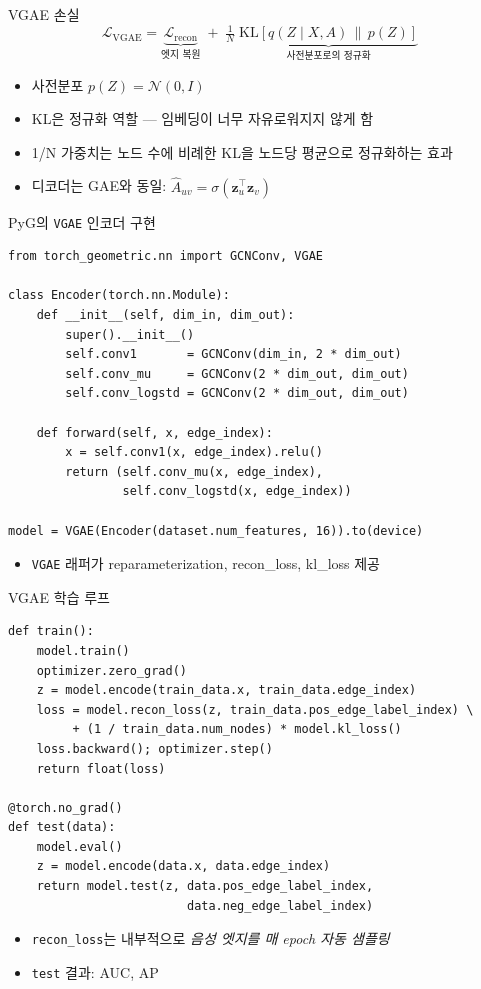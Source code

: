 \begin{frame}{VGAE 손실}
\begin{equation*}
  \mathcal{L}_{\text{VGAE}} = \underbrace{\mathcal{L}_{\text{recon}}}_{\text{엣지 복원}}
    \;+\; \tfrac{1}{N}\;\underbrace{\mathrm{KL}\!\left[q(Z\mid X,A)\,\|\,p(Z)\right]}_{\text{사전분포로의 정규화}}
\end{equation*}
\begin{itemize}
  \item 사전분포 $p(Z) = \mathcal{N}(0,I)$
  \item KL은 정규화 역할 — 임베딩이 너무 자유로워지지 않게 함
  \item 1/N 가중치는 노드 수에 비례한 KL을 노드당 평균으로 정규화하는 효과
  \item 디코더는 GAE와 동일: $\hat{A}_{uv} = \sigma(\mathbf{z}_u^\top \mathbf{z}_v)$
\end{itemize}
\end{frame}

\begin{frame}[fragile]{PyG의 \texttt{VGAE} 인코더 구현}
\begin{lstlisting}
from torch_geometric.nn import GCNConv, VGAE

class Encoder(torch.nn.Module):
    def __init__(self, dim_in, dim_out):
        super().__init__()
        self.conv1       = GCNConv(dim_in, 2 * dim_out)
        self.conv_mu     = GCNConv(2 * dim_out, dim_out)
        self.conv_logstd = GCNConv(2 * dim_out, dim_out)

    def forward(self, x, edge_index):
        x = self.conv1(x, edge_index).relu()
        return (self.conv_mu(x, edge_index),
                self.conv_logstd(x, edge_index))

model = VGAE(Encoder(dataset.num_features, 16)).to(device)
\end{lstlisting}
\begin{itemize}
  \item \texttt{VGAE} 래퍼가 reparameterization, recon\_loss, kl\_loss 제공
\end{itemize}
\end{frame}

\begin{frame}[fragile]{VGAE 학습 루프}
\begin{lstlisting}
def train():
    model.train()
    optimizer.zero_grad()
    z = model.encode(train_data.x, train_data.edge_index)
    loss = model.recon_loss(z, train_data.pos_edge_label_index) \
         + (1 / train_data.num_nodes) * model.kl_loss()
    loss.backward(); optimizer.step()
    return float(loss)

@torch.no_grad()
def test(data):
    model.eval()
    z = model.encode(data.x, data.edge_index)
    return model.test(z, data.pos_edge_label_index,
                         data.neg_edge_label_index)
\end{lstlisting}
\begin{itemize}
  \item \texttt{recon\_loss}는 내부적으로 \emph{음성 엣지를 매 epoch 자동 샘플링}
  \item \texttt{test} 결과: AUC, AP
\end{itemize}
\end{frame}

